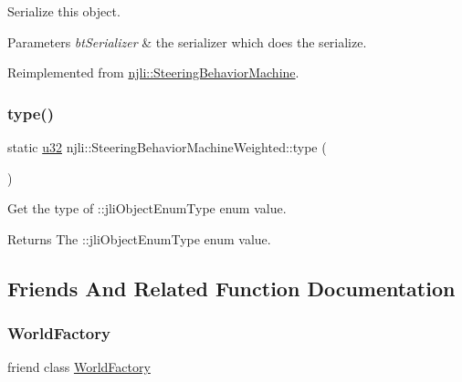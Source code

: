 Serialize this object.


\begin{DoxyParams}{Parameters}
{\em bt\+Serializer} & the serializer which does the serialize. \\
\hline
\end{DoxyParams}


Reimplemented from \mbox{\hyperlink{classnjli_1_1_steering_behavior_machine_a1fbec43b76f0612ed5b0d2492bb4b6df}{njli\+::\+Steering\+Behavior\+Machine}}.

\mbox{\label{classnjli_1_1_steering_behavior_machine_weighted_a695be63ffdee7fbf65aa90a7e0ceeb56}} 
\subsubsection{\texorpdfstring{type()}{type()}}
{\footnotesize\ttfamily static \mbox{\hyperlink{_util_8h_a10e94b422ef0c20dcdec20d31a1f5049}{u32}} njli\+::\+Steering\+Behavior\+Machine\+Weighted\+::type (\begin{DoxyParamCaption}{ }\end{DoxyParamCaption})\hspace{0.3cm}{\ttfamily [static]}}

Get the type of \+::jli\+Object\+Enum\+Type enum value.

\begin{DoxyReturn}{Returns}
The \+::jli\+Object\+Enum\+Type enum value. 
\end{DoxyReturn}


\subsection{Friends And Related Function Documentation}
\mbox{\label{classnjli_1_1_steering_behavior_machine_weighted_acb96ebb09abe8f2a37a915a842babfac}} 
\subsubsection{\texorpdfstring{World\+Factory}{WorldFactory}}
{\footnotesize\ttfamily friend class \mbox{\hyperlink{classnjli_1_1_world_factory}{World\+Factory}}\hspace{0.3cm}{\ttfamily [friend]}}



